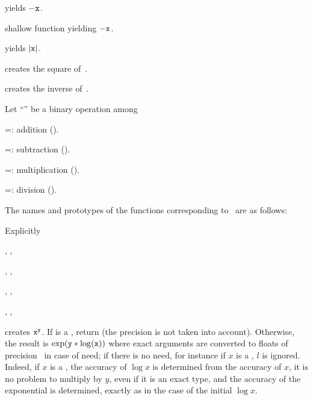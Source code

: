 
 yields $-{\tt x}$.

 shallow function yielding $-{\tt x}$.

 yields $|{\tt x}|$.

 creates the square of~.

 creates the inverse of~.


Let ``\op'' be a binary operation among

\op=: addition ().

\op=: subtraction ().

\op=: multiplication ().

\op=: division ().

\noindent The names and prototypes of the functions corresponding
to \op\ are as follows:




\noindent Explicitly

, ,

, ,

, ,

, ,


 creates ${\tt x}^{{\tt y}}$. If
 is a , return  (the precision  is not
taken into account). Otherwise, the result is $\exp({\tt y}*\log({\tt x}))$
where exact arguments are converted to floats of precision~ in case of
need; if there is no need, for instance if $x$ is a , $l$ is
ignored. Indeed, if $x$ is a , the accuracy of $\log x$ is
determined from the accuracy of $x$, it is no problem to multiply by $y$,
even if it is an exact type, and the accuracy of the exponential is
determined, exactly as in the case of the initial $\log x$.

